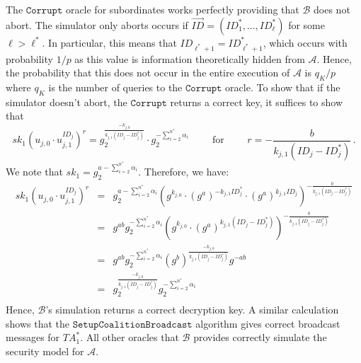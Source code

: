 \documentclass[10pt]{llncs}
\newcommand{\A}{\mathcal{A}}
\newcommand{\B}{\mathcal{B}}
\newcommand{\ID}{\mathit{ID}}
\newcommand{\TA}{\mathit{TA}}
\newcommand{\sk}{\mathit{sk}}
\begin{document}
The $\texttt{Corrupt}$ oracle for subordinates works perfectly
providing that $\B$ does not abort. The simulator only aborts occurs
if $\vec{\ID} = (\ID_{1}^{*},\ldots,\ID^{*}_{\ell})$ for some $\ell
> \ell^{*}$. In particular, this means that
$\ID_{\ell^{*}+1} = \ID^{*}_{\ell^{*}+1}$, which occurs with
probability $1/p$ as this value is information theoretically hidden
from $\A$. Hence, the probability that this does not occur in the
entire execution of $\A$ is $q_{K}/p$ where $q_{K}$ is the number of
queries to the $\texttt{Corrupt}$ oracle. To show that if the
simulator doesn't abort, the $\texttt{Corrupt}$ returns a correct
key, it suffices to show that
\begin{displaymath}
\sk_1 \left(u_{j,0}\cdot u_{j,1}^{\ID_{j}}\right)^{r} = g_{2}^{\frac{-k_{j,0}}{k_{j,1}(\ID_{j}-\ID^{*}_{j})}} \cdot g_{2}^{-\sum_{i=2}^{n^{*}} \alpha_{i}} \qquad \mbox{ for } \qquad r = -\frac{b}{k_{j,1}(\ID_{j}-\ID^{*}_{j})}\, .
\end{displaymath}
We note that $\sk_1 = g_{2}^{a-\sum_{i=2}^{n^{*}} \alpha_{i}}$.
Therefore, we have:
\begin{eqnarray*}
\sk_1 \left(u_{j,0}\cdot u_{j,1}^{\ID_{j}}\right)^{r} &=& g_{2}^{a-\sum_{i=2}^{n^{*}} \alpha_{i}} \left( g^{k_{j,0}} \cdot (g^{a})^{-k_{j,1}\ID^{*}_{j}} \cdot (g^{a})^{k_{j,1}\ID_{j}} \right)^{-\frac{b}{k_{j,1}(\ID_{j}-\ID^{*}_{j})}}\\
&=& g^{ab} g_{2}^{-\sum_{i=2}^{n^{*}}\alpha_{i}} \left( g^{k_{j,0}} \cdot (g^{a})^{k_{j,1}(\ID_{j}-\ID^{*}_{j})} \right)^{-\frac{b}{k_{j,1}(\ID_{j}-\ID^{*}_{j})}}\\
&=& g^{ab} g_{2}^{-\sum_{i=2}^{n^{*}}\alpha_{i}} (g^{b})^{\frac{-k_{j,0}}{k_{j,1}(\ID_{j}-\ID^{*}_{j})}}g^{-ab}\\
&=& g_{2}^{\frac{-k_{j,0}}{k_{j,1}(\ID_{j}-\ID^{*}_{j})}} g_{2}^{-\sum_{i=2}^{n^{*}}\alpha_{i}}\\
\end{eqnarray*}
Hence, $\B$'s simulation returns a correct decryption key. A similar
calculation shows that the $\texttt{SetupCoalitionBroadcast}$
algorithm gives correct broadcast messages for $\TA^{*}_{1}$. All
other oracles that $\B$ provides correctly simulate the security
model for $\A$.
\end{document}
